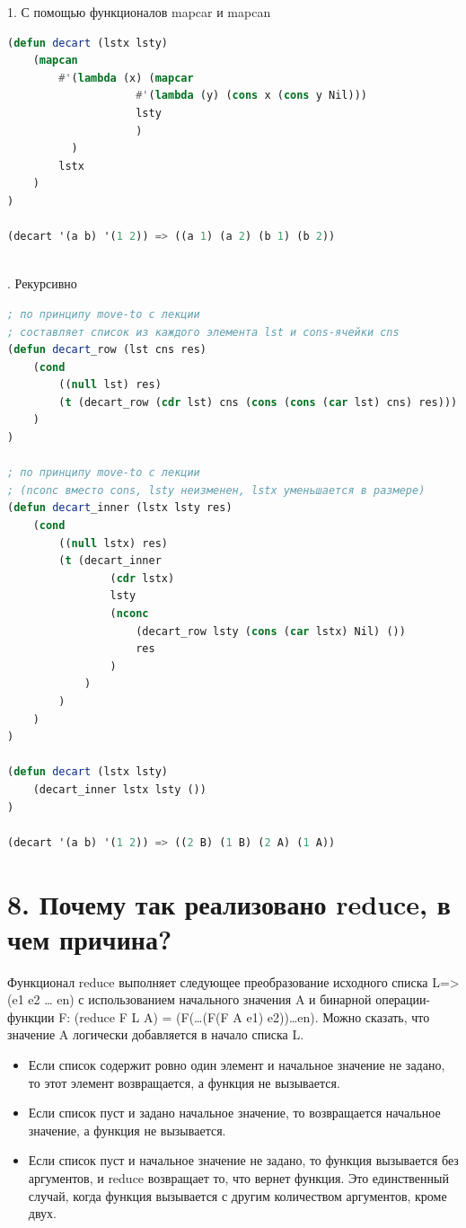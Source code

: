 \documentclass[12pt]{report}
\begin{document}
1. С помощью функционалов mapcar и mapcan
\begin{lstlisting}[language=Lisp]
(defun decart (lstx lsty) 
	(mapcan 
		#'(lambda (x) (mapcar 
					#'(lambda (y) (cons x (cons y Nil))) 
					lsty
					)
		  )
		lstx
	)
)
	
(decart '(a b) '(1 2)) => ((a 1) (a 2) (b 1) (b 2))
	
\end{lstlisting}

. Рекурсивно
\begin{lstlisting}[language=Lisp]
; по принципу move-to с лекции
; составляет список из каждого элемента lst и cons-ячейки cns
(defun decart_row (lst cns res) 
	(cond
		((null lst) res)
		(t (decart_row (cdr lst) cns (cons (cons (car lst) cns) res)))
	)
)

; по принципу move-to с лекции 
; (nconc вместо cons, lsty неизменен, lstx уменьшается в размере)
(defun decart_inner (lstx lsty res) 
	(cond
		((null lstx) res)
		(t (decart_inner 
				(cdr lstx) 
				lsty 
				(nconc 
					(decart_row lsty (cons (car lstx) Nil) ())
					res
				)
			)
		)
	)
)	

(defun decart (lstx lsty) 
	(decart_inner lstx lsty ())
)

(decart '(a b) '(1 2)) => ((2 B) (1 B) (2 A) (1 A))	
\end{lstlisting}

\clearpage
\section*{8. Почему так реализовано reduce, в чем причина?}

Функционал reduce выполняет следующее преобразование исходного списка L=>(e1 e2 … en) с использованием начального значения A и бинарной операции-функции F: (reduce F L A) = (F(…(F(F A e1) e2))…en). Можно сказать, что значение A логически добавляется в начало списка L.

\begin{itemize}
	\item Если список содержит ровно один элемент и начальное значение не задано, то этот элемент возвращается, а функция не вызывается. 
	\item Если список пуст и задано начальное значение, то возвращается начальное значение, а функция не вызывается. 
	\item Если список пуст и начальное значение не задано, то функция вызывается без аргументов, и reduce возвращает то, что вернет функция. Это единственный случай, когда функция вызывается с другим количеством аргументов, кроме двух.
\end{itemize}
\end{document}
